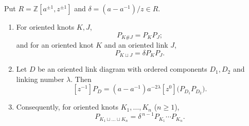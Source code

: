 \begin{lemma}
\label{lem:homflyrows}
Put $R=\mathbb Z[a^{\pm1},z^{\pm1}]$ and
$\delta=(a-a^{-1})/z\in R$.
\begin{enumerate}
\item[(i)] For oriented knots $K,J$,
\[
 P_{K\# J}=P_KP_J;
\]
and for an oriented knot $K$ and an oriented link $J$,
\[
 P_{K\sqcup J}=\delta P_KP_J.
\]
\item[(ii)] Let $D$ be an oriented link diagram with ordered components
$D_1,D_2$ and linking number $\lambda$. Then
\[
 [z^{-1}]P_D=(a-a^{-1})a^{-2\lambda}
       [z^0]\bigl(P_{D_1}P_{D_2}\bigr).
\]
\item[(iii)] Consequently, for oriented knots $K_1,\dots,K_n$ ($n\geq1$),
\[
 P_{K_1\sqcup\dots\sqcup K_n}=\delta^{\,n-1}P_{K_1}\cdots P_{K_n}.
\]
\end{enumerate}
\end{lemma}
